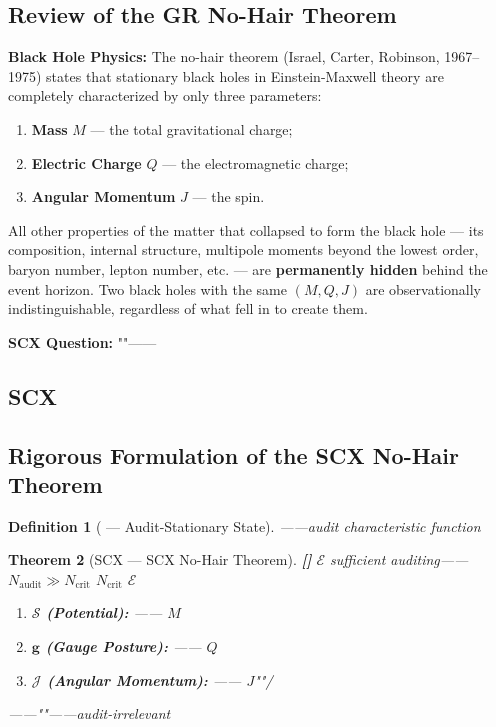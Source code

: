 \documentclass[12pt,a4paper]{article}
\newtheorem{theorem}{Theorem}[section]
\newtheorem{definition}[theorem]{Definition}
\theoremstyle{remark}
\newcommand{\g}{\mathbf{g}}
\newcommand{\rigorFull}{\textnormal{\textbf{[]}}}
\begin{document}
\subsection{Review of the GR No-Hair Theorem}

\noindent
\textbf{Black Hole Physics:} The no-hair theorem (Israel, Carter, Robinson, 1967--1975) states that stationary black holes in Einstein-Maxwell theory are completely characterized by only three parameters:
\begin{enumerate}[label=(\arabic*)]
    \item \textbf{Mass} $M$ — the total gravitational charge;
    \item \textbf{Electric Charge} $Q$ — the electromagnetic charge;
    \item \textbf{Angular Momentum} $J$ — the spin.
\end{enumerate}

All other properties of the matter that collapsed to form the black hole — its composition, internal structure, multipole moments beyond the lowest order, baryon number, lepton number, etc. — are \textbf{permanently hidden} behind the event horizon. Two black holes with the same $(M, Q, J)$ are observationally indistinguishable, regardless of what fell in to create them.

\vspace{6pt}
\noindent
\textbf{SCX Question:} ""——

\subsection{SCX}
\subsection{Rigorous Formulation of the SCX No-Hair Theorem}

\begin{definition}[ — Audit-Stationary State]\label{def:audit_stationary}
\textbf{}——audit characteristic function
\end{definition}

\begin{theorem}[SCX — SCX No-Hair Theorem]\label{thm:no_hair}\rigorFull
 $\mathcal{E}$ sufficient auditing—— $N_{\mathrm{audit}} \gg N_{\mathrm{crit}}$ $N_{\mathrm{crit}}$  $\mathcal{E}$ 

\begin{enumerate}[label=(\roman*)]
    \item \textbf{ $\mathcal{S}$ (Potential):} —— $M$
    \item \textbf{ $\g$ (Gauge Posture):} —— $Q$
    \item \textbf{ $\mathcal{J}$ (Angular Momentum):} —— $J$""/
\end{enumerate}

——""——\textbf{}audit-irrelevant
\end{theorem}
\end{document}
